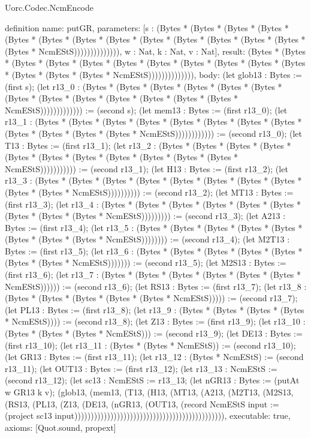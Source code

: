 \begin{lexlean}{Uorc.Codec.NcmEncode}
\begin{semanticmodule}
definition{
  name: putGR,
  parameters: [s : (Bytes * (Bytes * (Bytes * (Bytes * (Bytes * (Bytes * (Bytes * (Bytes * (Bytes * (Bytes * (Bytes * (Bytes * (Bytes * (Bytes * NcmEStS)))))))))))))), w : Nat, k : Nat, v : Nat],
  result: (Bytes * (Bytes * (Bytes * (Bytes * (Bytes * (Bytes * (Bytes * (Bytes * (Bytes * (Bytes * (Bytes * (Bytes * (Bytes * (Bytes * NcmEStS)))))))))))))),
  body: (let glob13 : Bytes := (first s); (let r13_0 : (Bytes * (Bytes * (Bytes * (Bytes * (Bytes * (Bytes * (Bytes * (Bytes * (Bytes * (Bytes * (Bytes * (Bytes * (Bytes * NcmEStS))))))))))))) := (second s); (let mem13 : Bytes := (first r13_0); (let r13_1 : (Bytes * (Bytes * (Bytes * (Bytes * (Bytes * (Bytes * (Bytes * (Bytes * (Bytes * (Bytes * (Bytes * (Bytes * NcmEStS)))))))))))) := (second r13_0); (let T13 : Bytes := (first r13_1); (let r13_2 : (Bytes * (Bytes * (Bytes * (Bytes * (Bytes * (Bytes * (Bytes * (Bytes * (Bytes * (Bytes * (Bytes * NcmEStS))))))))))) := (second r13_1); (let H13 : Bytes := (first r13_2); (let r13_3 : (Bytes * (Bytes * (Bytes * (Bytes * (Bytes * (Bytes * (Bytes * (Bytes * (Bytes * (Bytes * NcmEStS)))))))))) := (second r13_2); (let MT13 : Bytes := (first r13_3); (let r13_4 : (Bytes * (Bytes * (Bytes * (Bytes * (Bytes * (Bytes * (Bytes * (Bytes * (Bytes * NcmEStS))))))))) := (second r13_3); (let A213 : Bytes := (first r13_4); (let r13_5 : (Bytes * (Bytes * (Bytes * (Bytes * (Bytes * (Bytes * (Bytes * (Bytes * NcmEStS)))))))) := (second r13_4); (let M2T13 : Bytes := (first r13_5); (let r13_6 : (Bytes * (Bytes * (Bytes * (Bytes * (Bytes * (Bytes * (Bytes * NcmEStS))))))) := (second r13_5); (let M2S13 : Bytes := (first r13_6); (let r13_7 : (Bytes * (Bytes * (Bytes * (Bytes * (Bytes * (Bytes * NcmEStS)))))) := (second r13_6); (let RS13 : Bytes := (first r13_7); (let r13_8 : (Bytes * (Bytes * (Bytes * (Bytes * (Bytes * NcmEStS))))) := (second r13_7); (let PL13 : Bytes := (first r13_8); (let r13_9 : (Bytes * (Bytes * (Bytes * (Bytes * NcmEStS)))) := (second r13_8); (let Z13 : Bytes := (first r13_9); (let r13_10 : (Bytes * (Bytes * (Bytes * NcmEStS))) := (second r13_9); (let DE13 : Bytes := (first r13_10); (let r13_11 : (Bytes * (Bytes * NcmEStS)) := (second r13_10); (let GR13 : Bytes := (first r13_11); (let r13_12 : (Bytes * NcmEStS) := (second r13_11); (let OUT13 : Bytes := (first r13_12); (let r13_13 : NcmEStS := (second r13_12); (let sc13 : NcmEStS := r13_13; (let nGR13 : Bytes := (putAt w GR13 k v); (glob13, (mem13, (T13, (H13, (MT13, (A213, (M2T13, (M2S13, (RS13, (PL13, (Z13, (DE13, (nGR13, (OUT13, (record NcmEStS {input := (project sc13 input)}))))))))))))))))))))))))))))))))))))))))))))),
  executable: true,
  axioms: [Quot.sound, propext]
}


\end{semanticmodule}
\end{lexlean}
